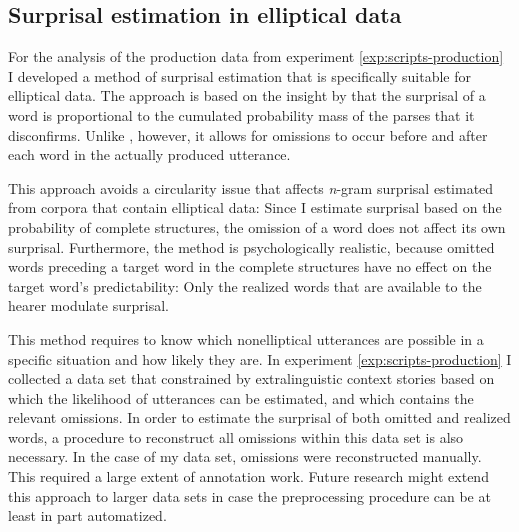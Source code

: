 \subsection{Surprisal estimation in elliptical data}
For the analysis of the production data from experiment \ref{exp:scripts-production} I developed a method of surprisal estimation that is specifically suitable for elliptical data. The approach is based on the insight by \citet{hale2001} that the surprisal of a word is proportional to the cumulated probability mass of the parses that it disconfirms. Unlike \citet{hale2001}, however, it allows for omissions to occur before and after each word in the actually produced utterance. 

This approach avoids a circularity issue that affects \textit{n}-gram surprisal estimated from corpora that contain elliptical data: Since I estimate surprisal based on the probability of complete structures, the omission of a word does not affect its own surprisal. Furthermore, the method is psychologically realistic, because omitted words preceding a target word in the complete structures have no effect on the target word's predictability: Only the realized words that are available to the hearer modulate surprisal. %

This method requires to know which nonelliptical utterances are possible in a specific situation and how likely they are. In experiment \ref{exp:scripts-production} I collected a data set that constrained by extralinguistic context stories based on which the likelihood of utterances can be estimated, and which contains the relevant omissions. In order to estimate the surprisal of both omitted and realized words, a procedure to reconstruct all omissions within this data set is also necessary. In the case of my data set, omissions were reconstructed manually. This required a large extent of annotation work. Future research might extend this approach to larger data sets in case the preprocessing procedure can be at least in part automatized.

